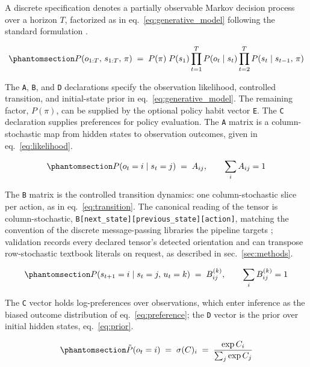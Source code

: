 \documentclass[
  english,
  9pt,
]{extarticle}
\begin{document}
A discrete specification denotes a partially observable Markov decision
process over a horizon \(T\), factorized as in
eq.~\ref{eq:generative_model} following the standard formulation
\citep{dacosta2020, smith2022}.

\begin{equation}\protect\phantomsection\label{eq:generative_model}{P(o_{1:T},\, s_{1:T},\, \pi) \;=\; P(\pi)\; P(s_1) \prod_{t=1}^{T} P(o_t \mid s_t) \prod_{t=2}^{T} P(s_t \mid s_{t-1},\, \pi)}\end{equation}

The \texttt{A}, \texttt{B}, and \texttt{D} declarations specify the
observation likelihood, controlled transition, and initial-state prior
in eq.~\ref{eq:generative_model}. The remaining factor, \(P(\pi)\), can
be supplied by the optional policy habit vector \texttt{E}. The
\texttt{C} declaration supplies preferences for policy evaluation. The
\texttt{A} matrix is a column-stochastic map from hidden states to
observation outcomes, given in eq.~\ref{eq:likelihood}.

\begin{equation}\protect\phantomsection\label{eq:likelihood}{P(o_t = i \mid s_t = j) \;=\; A_{ij}, \qquad \sum_i A_{ij} = 1}\end{equation}

The \texttt{B} matrix is the controlled transition dynamics: one
column-stochastic slice per action, as in eq.~\ref{eq:transition}. The
canonical reading of the tensor is column-stochastic,
\texttt{B{[}next\_state{]}{[}previous\_state{]}{[}action{]}}, matching
the convention of the discrete message-passing libraries the pipeline
targets \citep{heins2022}; validation records every declared tensor's
detected orientation and can transpose row-stochastic textbook literals
on request, as described in sec.~\ref{sec:methods}.

\begin{equation}\protect\phantomsection\label{eq:transition}{P(s_{t+1} = i \mid s_t = j,\, u_t = k) \;=\; B^{(k)}_{ij}, \qquad \sum_i B^{(k)}_{ij} = 1}\end{equation}

The \texttt{C} vector holds log-preferences over observations, which
enter inference as the biased outcome distribution of
eq.~\ref{eq:preference}; the \texttt{D} vector is the prior over initial
hidden states, eq.~\ref{eq:prior}.

\begin{equation}\protect\phantomsection\label{eq:preference}{\tilde{P}(o_t = i) \;=\; \sigma(C)_i \;=\; \frac{\exp C_i}{\sum_j \exp C_j}}\end{equation}
\end{document}
